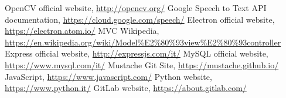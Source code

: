 \begin{thebibliography}{99}
\raggedright
 OpenCV official website, \url{http://opencv.org/}
 Google Speech to Text API documentation, \url{https://cloud.google.com/speech/}
 Electron official website, \url{https://electron.atom.io/}
 MVC Wikipedia, \url{https://en.wikipedia.org/wiki/Model%E2%80%93view%E2%80%93controller}
 Express official website, \url{http://expressjs.com/it/}
 MySQL official website, \url{https://www.mysql.com/it/}
 Mustache Git Site, \url{https://mustache.github.io/}
 JavaScript, \url{https://www.javascript.com/}
 Python website, \url{https://www.python.it/}
 GitLab website, \url{https://about.gitlab.com/}

\end{thebibliography}
